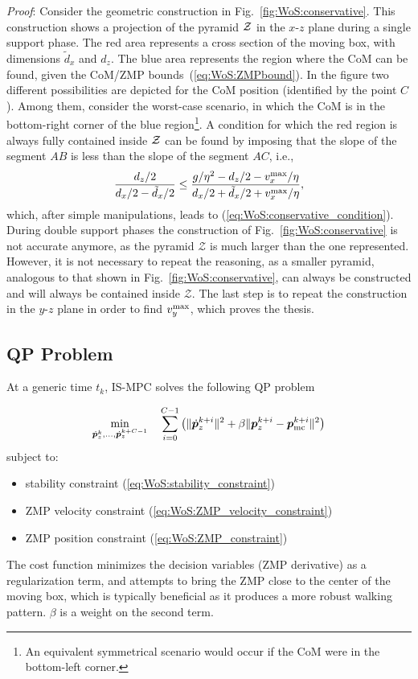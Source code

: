 {\em Proof}: Consider the geometric construction in Fig.~\ref{fig:WoS:conservative}. This construction shows a projection of the pyramid ${\cal Z}$ in the $x$-$z$ plane during a single support phase. The red area represents a cross section of the moving box, with dimensions $\tilde d_x$ and $d_z$. The blue area represents the region where the CoM can be found, given the CoM/ZMP bounds~(\ref{eq:WoS:ZMPbound}). In the figure two different possibilities are depicted for the CoM position (identified by the point $C$). Among them, consider the worst-case scenario, in which the CoM is in the bottom-right corner of the blue region\footnote{An equivalent symmetrical scenario would occur if the CoM were in the bottom-left corner. }. A condition for which the red region is always fully contained inside $\cal Z$ can be found by imposing that the slope of the segment $AB$ is less than the slope of the segment $AC$, i.e.,
\begin{equation}
\frac{d_z/2}{d_x/2 - \tilde d_x/2} \le \frac{g/\eta^2 - d_z/2 - v^{\rm max}_x/\eta}{d_x/2 + \tilde d_x/2 + v^{\rm max}_x/\eta},
\end{equation}
which, after simple manipulations, leads to (\ref{eq:WoS:conservative_condition}). During double support phases the construction of Fig.~\ref{fig:WoS:conservative} is not accurate anymore, as the pyramid $\mathcal{Z}$ is much larger than the one represented. However, it is not necessary to repeat the reasoning, as a smaller pyramid, analogous to that shown in Fig.~\ref{fig:WoS:conservative}, can always be constructed and will always be contained inside $\mathcal{Z}$. The last step is to repeat the construction in the $y$-$z$ plane in order to find $v_y^{\rm max}$, which proves the thesis.
\hfill\bull
\smallskip
\subsection{QP Problem}
At a generic time $t_k$, IS-MPC solves the following QP problem

\smallskip

\begin{braced}
\[
\min_{\dot {{\bm{p}}}_z^k, \dots, \dot {{\bm{p}}}_z^{k+C-1}} \quad \sum_{i=0}^{C-1} \left(\|\dot{{\bm{p}}}_z^{k+i}\|^2 + \beta\|{\bm{p}}_z^{k+i} - {\bm{p}}_{\rm mc}^{k+i}\|^2\right)
\]
\hspace{0.25cm} subject to:
\begin{itemize}
\item stability constraint (\ref{eq:WoS:stability_constraint})
\item ZMP velocity constraint (\ref{eq:WoS:ZMP_velocity_constraint})
\item ZMP position constraint (\ref{eq:WoS:ZMP_constraint})
\end{itemize}
\end{braced}
\smallskip
The cost function minimizes the decision variables (ZMP derivative) as a regularization term, and attempts to bring the ZMP close to the center of the moving box, which is typically beneficial as it produces a more robust walking pattern. $\beta$ is a weight on the second term.

